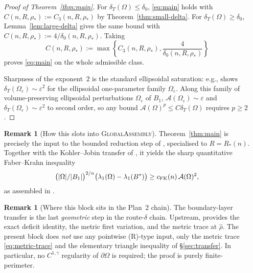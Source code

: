 \documentclass[11pt]{article}
\theoremstyle{definition}
\newtheorem{remark}[theorem]{Remark}
\newcommand{\Fr}{\mathcal{A}}
\newcommand{\Om}{\Omega}
\newcommand{\eps}{\varepsilon}
\newcommand{\rstar}{\rho_{*}}
\newcommand{\rhad}{\widehat\rho}
\begin{document}
\begin{proof}[Proof of Theorem~\ref{thm:main}]
For $\delta_T(\Om)\le\delta_0$, \eqref{eq:main} holds with
$C(n,R,\rstar):=C_3(n,R,\rstar)$ by
Theorem~\ref{thm:small-delta}. For $\delta_T(\Om)\ge \delta_0$,
Lemma~\ref{lem:large-delta} gives the same bound with
$C(n,R,\rstar):=4/\delta_0(n,R,\rstar)$. Taking
\begin{equation}\label{eq:C-final}
C(n,R,\rstar):=\max\!\left\{C_3(n,R,\rstar),\frac{4}{\delta_0(n,R,\rstar)}\right\}
\end{equation}
proves \eqref{eq:main} on the whole admissible class.

Sharpness of the exponent~$2$ is the standard ellipsoidal saturation:
e.g., \cite[Introduction]{BraDeP2017} shows
$\delta_T(\Om_\eps)\sim\eps^2$ for the ellipsoidal one-parameter family
$\Om_\eps$. Along this family of
volume-preserving ellipsoidal perturbations $\Om_\eps$ of $B_1$,
$\Fr(\Om_\eps)\sim\eps$ and $\delta_T(\Om_\eps)\sim\eps^2$ to second
order, so any bound $\Fr(\Om)^p\le C\delta_T(\Om)$ requires $p\ge 2$.
\end{proof}

\begin{remark}[How this slots into \textsc{GlobalAssembly}]
\label{rem:downstream}
Theorem~\ref{thm:main} is precisely the input to the bounded reduction
step of \cite[Theorem~5.1]{BDV-BoundedReduction-Plan1}, specialised to
$R=R_*(n)$. Together with the Kohler--Jobin transfer of
\cite[Theorem~6.1]{KohlerJobinTransfer-Plan1}, it yields the
sharp quantitative Faber--Krahn inequality
\[
\bigl(|\Om|/|B_1|\bigr)^{2/n}\bigl(\lambda_1(\Om)-\lambda_1(B^*)\bigr)
\ge c_{\rm FK}(n)\,\Fr(\Om)^{2},
\]
as assembled in \cite[\S6]{GlobalAssembly}.
\end{remark}

\begin{remark}[Where this block sits in the Plan~2 chain]
The boundary-layer transfer is the last \emph{geometric} step in the
route-$\delta$ chain. Upstream, \cite{LevelSetIdentity} provides the
exact deficit identity, \cite{MetricFramework} the metric first
variation, and \cite{WeightedMetricTrace} the metric trace at
$\rhad$. The present block does \emph{not} use any pointwise (R)-type
input, only the metric trace \eqref{eq:metric-trace} and the elementary
triangle inequality of \S\ref{sec:transfer}. In particular, no
$C^{1,\gamma}$ regularity of $\partial\Om$ is required; the proof is
purely finite-perimeter.
\end{remark}
\end{document}
